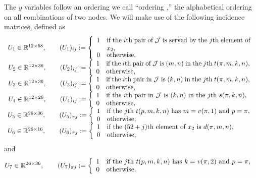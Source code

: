 The $y$ variables follow an ordering we call ``ordering ,'' the alphabetical ordering on all combinations of two nodes.  We will make use of the following incidence matrices, defined as
\[
\ajfbox{%
U_1\in\reals^{12\times 68},\qquad (U_1)_{ij}\assign\left\{\begin{array}{lp{3in}}%
1 & \parbox[t]{3.0in}{if the $i$th pair of \curly{J} is served by the $j$th element of $x_2$, }\\
0 & \text{otherwise},%
\end{array}\right.\\
U_2\in\reals^{12\times 36},\qquad (U_2)_{ij}\assign\left\{\begin{array}{lp{3in}}%
1 & \parbox[t]{3in}{if the $i$th pair of \curly{J} is $(m,n)$ in the $j$th $t(\pi,m,k,n)$,}\\
0 & \text{otherwise},%
\end{array}\right.\\
U_3\in\reals^{12\times 36},\qquad (U_3)_{ij}\assign\left\{\begin{array}{lp{3in}}%
1 & \parbox[t]{3in}{if the $i$th pair in \curly{J} is $(k,n)$ in the $j$th $t(\pi,m,k,n)$,}\\
0 & \text{otherwise},%
\end{array}\right.\\
U_4\in\reals^{12\times 26},\qquad (U_4)_{ij}\assign\left\{\begin{array}{lp{3in}}%
1 & \parbox[t]{3in}{if the $i$th pair in \curly{J} is $(k,n)$ in the $j$th $s(\pi,k,n)$,}\\
0 & \text{otherwise},%
\end{array}\right.\\
U_5\in\reals^{26\times 36},\qquad (U_5)_{\pi j}\assign\left\{\begin{array}{lp{3in}}%
1 & \parbox[t]{3in}{if the $j$th $t(p,m,k,n)$ has $m=v(\pi,1)$ and $p=\pi$,}\\
0 & \text{otherwise},%
\end{array}\right.\\
U_6\in\reals^{26\times 16},\qquad (U_6)_{\pi j}\assign\left\{\begin{array}{lp{3in}}%
1 & \parbox[t]{3in}{if the $(52+j)$th element of $x_2$ is $d(\pi,m,n)$,}\\
0 & \text{otherwise},%
\end{array}\right.}%
\]
and
\[
U_7\in\reals^{26\times 36},\qquad (U_7)_{\pi j}\assign\left\{\begin{array}{lp{3in}}%
1 & \parbox[t]{3in}{if the $j$th $t(p,m,k,n)$ has $k=v(\pi,2)$ and $p=\pi$,}\\
0 & \text{otherwise}.%
\end{array}\right.
\]

